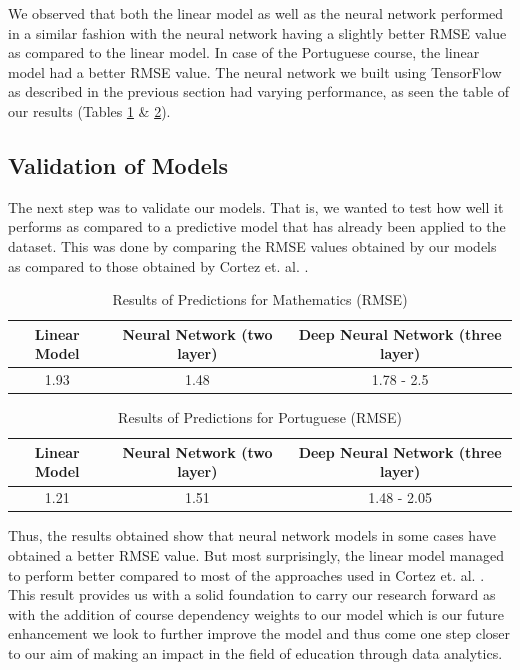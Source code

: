\documentclass[conference]{IEEEtran}
\begin{document}
We observed that both the linear model as well as the neural network performed in a similar fashion with the neural network having a slightly better RMSE value as compared to the linear model. In case of the Portuguese course, the linear model had a better RMSE value. The neural network we built using TensorFlow \cite{tensorflow2015-whitepaper} as described in the previous section had varying performance, as seen the table of our results (Tables \ref{table:res-mat} \& \ref{table:res-por}).

	\subsection{Validation of Models}
The next step was to validate our models. That is, we wanted to test how well it
performs as compared to a predictive model that has already been applied to the
dataset. This was done by comparing the RMSE values obtained by our models as compared to those obtained by Cortez et. al. \cite{ref:4}.

\begin{table}[!t]
\renewcommand{\arraystretch}{1.3}
\caption{Results of Predictions for Mathematics (RMSE)}
\label{table:res-mat}
\centering
\begin{tabular}{|c c c|}
\hline
\bfseries Linear Model & \bfseries Neural Network (two layer) & \bfseries Deep Neural Network (three layer)\\
\hline
1.93 & 1.48 & 1.78 - 2.5\\
\hline
\end{tabular}
\end{table}

\begin{table}[!t]
\renewcommand{\arraystretch}{1.3}
\caption{Results of Predictions for Portuguese (RMSE)}
\label{table:res-por}
\centering
\begin{tabular}{|c c c|}
\hline
\bfseries Linear Model & \bfseries Neural Network (two layer) & \bfseries Deep Neural Network (three layer)\\
\hline
1.21 & 1.51 & 1.48 - 2.05\\
\hline
\end{tabular}
\end{table}

Thus, the results obtained show that neural network models in some cases have 
obtained a better RMSE value. But most surprisingly, the linear model managed to perform better compared to most of the approaches used in Cortez et. al. \cite{ref:4}. This result provides us with a solid foundation to carry our research forward as with the addition of course dependency weights to our model which is our future enhancement we look to further improve the model and thus come one step closer to our aim of making an impact in the field of education through data analytics.
\end{document}
